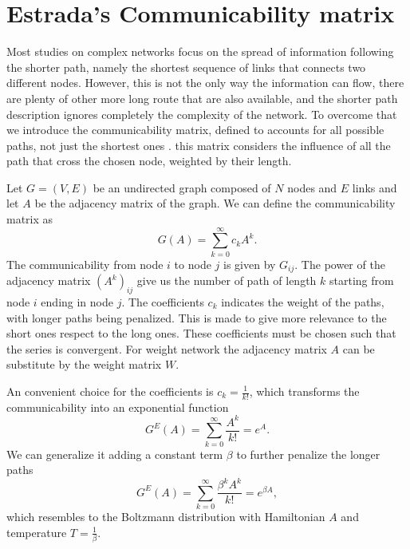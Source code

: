 \section{Estrada's Communicability matrix}

Most studies on complex networks focus on the spread of information following the shorter path, namely the shortest sequence of links that connects two different nodes. 
However, this is not the only way the information can flow, there are plenty of other more long route that are also available, and the shorter path description ignores completely the complexity of the network.
To overcome that we introduce the communicability matrix, defined to accounts for all possible paths, not just the shortest ones \cite{Estrada_2012}. this matrix considers the influence of all the path that cross the chosen node, weighted by their length.

Let $G=(V,E)$ be an undirected graph composed of $N$ nodes and $E$ links and let $A$ be the adjacency matrix of the graph.
We can define the communicability matrix as
\begin{equation}
    G(A) = \sum_{k=0}^{\infty}c_k A^k.
\end{equation}
The communicability from node $i$ to node $j$ is given by $G_{ij}$. The power of the adjacency matrix $(A^k)_{ij}$ give us the number of path of length $k$ starting from node $i$ ending in node $j$.
The coefficients $c_k$ indicates the weight of the paths, with longer paths being penalized. This is made to give more relevance to the short ones respect to the long ones. These coefficients must be chosen such that the series is convergent.
For weight network the adjacency matrix $A$ can be substitute by the weight matrix $W$.

An convenient choice for the coefficients is $c_k = \frac{1}{k!}$, which transforms the communicability into an exponential function \cite{Estrada_2008}
\begin{equation}\label{G_E}
    G^E(A) =\sum_{k=0}^{\infty} \frac{A^k}{k!} = e^{A} .
\end{equation}
We can generalize it adding a constant term $\beta$ to further penalize the longer paths
\begin{equation}
    G^E(A) =\sum_{k=0}^{\infty} \frac{\beta^k A^k}{k!} = e^{\beta A} ,
\end{equation}
which resembles to the Boltzmann distribution with Hamiltonian $A$ and temperature $T = \frac{1}{\beta}$.

